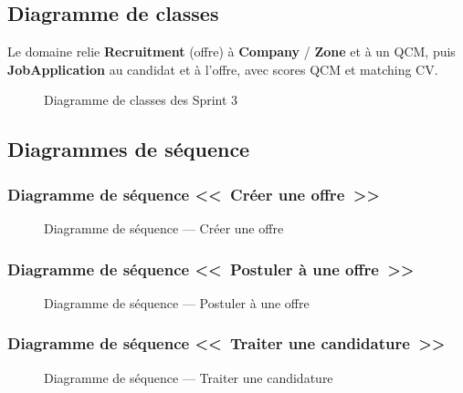 \subsection{Diagramme de classes}

Le domaine relie \textbf{Recruitment} (offre) à \textbf{Company} /
\textbf{Zone} et à un QCM, puis \textbf{JobApplication} au candidat et à
l'offre, avec scores QCM et matching CV.

\begin{figure}[H]
  \centering
  \caption{Diagramme de classes des Sprint 3}
  \label{fig:class-sprint3}
\end{figure}


\subsection{Diagrammes de séquence}

\subsubsection{Diagramme de séquence <<~Créer une offre~>>}

\begin{figure}[H]
  \centering
  \caption{Diagramme de séquence --- Créer une offre}
  \label{fig:seq-create-offer}
\end{figure}

\subsubsection{Diagramme de séquence <<~Postuler à une offre~>>}

\begin{figure}[H]
  \centering
  \caption{Diagramme de séquence --- Postuler à une offre}
  \label{fig:seq-apply}
\end{figure}

\subsubsection{Diagramme de séquence <<~Traiter une candidature~>>}

\begin{figure}[H]
  \centering
  \caption{Diagramme de séquence --- Traiter une candidature}
  \label{fig:seq-process-app}
\end{figure}


